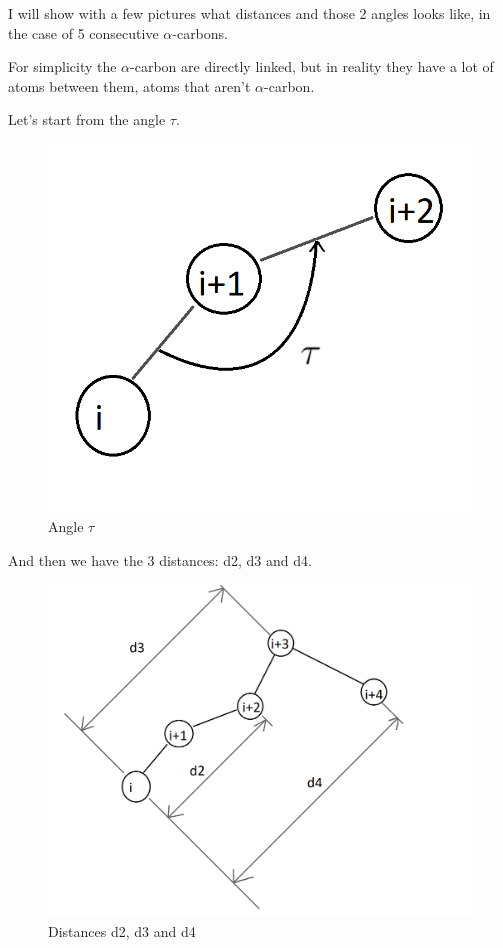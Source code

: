 I will show with a few pictures what distances and those 2 angles looks like, in the case of 5 consecutive $\alpha$-carbons. 

For simplicity the $\alpha$-carbon are directly linked, but in reality they have a lot of atoms between them, atoms that aren't $\alpha$-carbon.

Let's start from the angle $\tau$.

\begin{figure}[h!]
    \centering
    \includegraphics[scale=0.5]{res/dev/angleTau.png}
    \caption{Angle $\tau$}
\end{figure}

\pagebreak

And then we have the 3 distances: d2, d3 and d4.

\begin{figure}[h!]
    \centering
    \includegraphics[scale=0.35]{res/dev/distances.png}
    \caption{Distances d2, d3 and d4}
    \label{fig:enter-label}
\end{figure}

